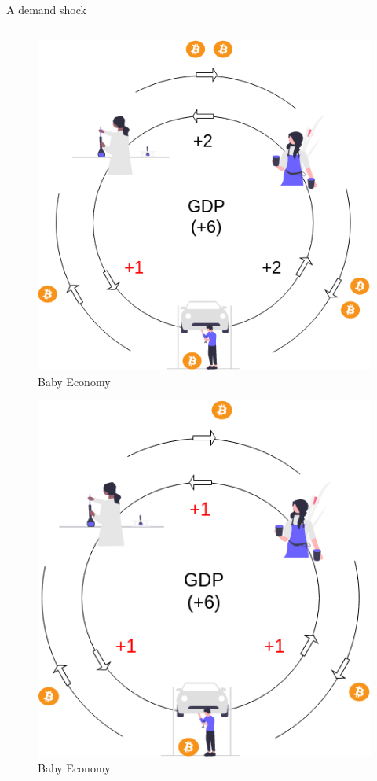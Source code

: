 \begin{frame}{A demand shock}
\begin{columns}[T]
\begin{column}{0.48\textwidth}
\begin{overprint}
\begin{figure}
\centering
\includegraphics[width=1\textwidth,height=\textheight]{assets/circular_keynes.png}
\caption{Baby Economy}
\end{figure}


\begin{figure}
\centering
\includegraphics[width=1\textwidth,height=\textheight]{assets/circular_keynes_badeq.png}
\caption{Baby Economy}
\end{figure}


\end{overprint}
\end{column}
\end{columns}
\end{frame}
